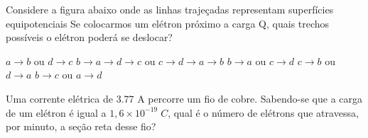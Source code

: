 \documentclass[12pt, addpoints]{exam}
\begin{document}
    \begin{questions}
\begin{multicols*}{2}
\question Considere a figura abaixo onde as linhas trajeçadas representam superfícies equipotenciais Se colocarmos um elétron próximo a carga Q, quais trechos possíveis o elétron poderá se deslocar?
        
        \begin{center}
            \begin{minipage}[c]{0.5\linewidth}
            \end{minipage}
        \end{center}
        
        

\begin{choices}
\choice $a\rightarrow b$ ou $d\rightarrow c$ 
\choice $b\rightarrow a\rightarrow d\rightarrow c$ ou $c\rightarrow d\rightarrow a\rightarrow b$ 
\choice $b\rightarrow a$ ou $c\rightarrow d$ 
\choice $c\rightarrow b$ ou $d\rightarrow a$ 
\choice $b\rightarrow c$ ou $a\rightarrow d$ 
\end{choices}
\question Uma corrente elétrica de    3.77 A percorre um ﬁo de cobre. Sabendo-se que a carga de um elétron é igual a $1,6\times 10^{-19}\;C$, qual é o número de elétrons que atravessa, por minuto, a seção reta desse ﬁo?


\end{multicols*}
\end{questions}
\end{document}
